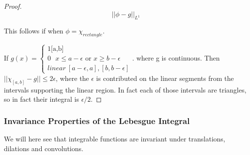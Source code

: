 \documentclass[class=article, crop=false]{standalone}
\begin{document}
\begin{proof}
					$$||\phi - g||_{L^1}$$

				This follows if when $\phi = \chi_{rectangle}$. 

				If $g(x) = \begin{cases} 1 \mbox{[a,b]} \\ 0 \mbox{ } x \le a - \epsilon \mbox{ or } x \ge b - \epsilon \\ linear \ [a - \epsilon, a], [b, b-\epsilon] \end{cases}$. where g is continuous. Then $||\chi_{[a,b]} - g|| \le 2\epsilon$, where the $\epsilon$ is contributed on the linear segments from the intervals supporting the linear region. In fact each of those intervals are triangles, so in fact their integral is $\epsilon / 2$.
			\end{proof}
		\subsubsection{Invariance Properties of the Lebesgue Integral}
			We will here see that integrable functions are invariant under translations, dilations and convolutions.
\end{document}
